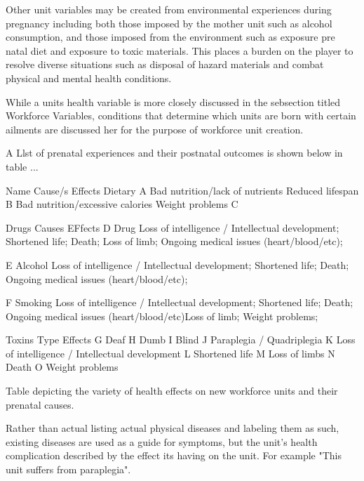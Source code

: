 Other unit variables may be created from environmental experiences during pregnancy including both those imposed by the mother unit such as alcohol consumption, and those imposed from the environment such as exposure pre natal diet and exposure to toxic materials. This places a burden on the player to resolve diverse situations such as disposal of hazard materials and combat physical and mental health conditions.

While a units health variable is more closely discussed in the sebsection titled Workforce Variables, conditions that determine which units are born with certain ailments are discussed her for the purpose of workforce unit creation.

A Llst of prenatal experiences and their postnatal outcomes is shown below in table ...



 Name  		Cause/s					Effects				
Dietary							
  A		Bad nutrition/lack of nutrients		Reduced lifespan			
  B		Bad nutrition/excessive calories	Weight problems
  C							
							
Drugs		Causes					EFfects	
  D		Drug					Loss of intelligence / Intellectual development; Shortened life; Death; Loss of limb; Ongoing 								medical issues (heart/blood/etc);
  
  E		Alcohol					Loss of intelligence / Intellectual development; Shortened life; Death; Ongoing medical issues 								(heart/blood/etc);
  
  F		Smoking					Loss of intelligence / Intellectual development; Shortened life; Death; Ongoing medical issues 								(heart/blood/etc)Loss of limb; Weight problems;
							
Toxins		Type					Effects	
  G							Deaf	
  H							Dumb	
  I							Blind
  J							Paraplegia / Quadriplegia
  K							Loss of intelligence / Intellectual development
  L							Shortened life
  M							Loss of limbs
  N							Death
  O							Weight problems

Table depicting the variety of health effects on new workforce units and their prenatal causes.


Rather than actual listing actual physical diseases and labeling them as such, existing diseases are used as a guide for symptoms, but the unit's health complication described by the effect its having on the unit. For example "This unit suffers from paraplegia".



